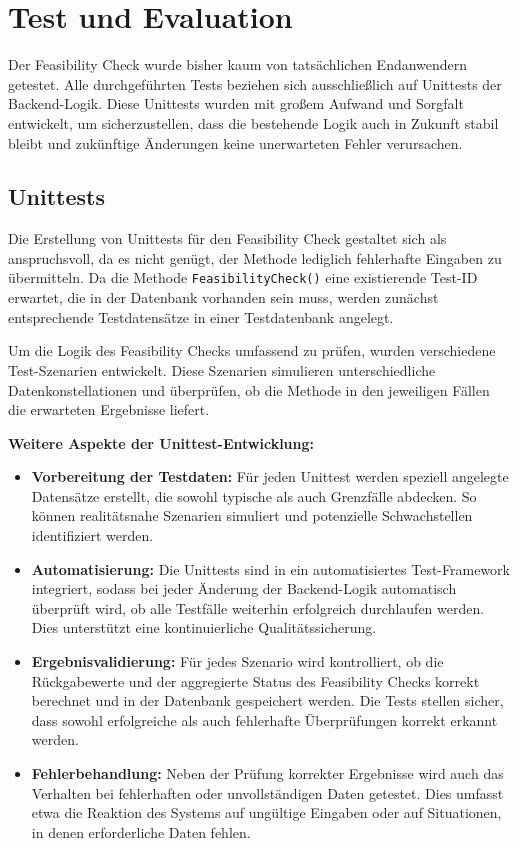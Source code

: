 \chapter{Test und Evaluation}

Der Feasibility Check wurde bisher kaum von tatsächlichen Endanwendern getestet. Alle durchgeführten Tests beziehen sich ausschließlich auf Unittests der Backend-Logik. Diese Unittests wurden mit großem Aufwand und Sorgfalt entwickelt, um sicherzustellen, dass die bestehende Logik auch in Zukunft stabil bleibt und zukünftige Änderungen keine unerwarteten Fehler verursachen.
\section{Unittests}

Die Erstellung von Unittests für den Feasibility Check gestaltet sich als anspruchsvoll, da es nicht genügt, der Methode lediglich fehlerhafte Eingaben zu übermitteln. Da die Methode \texttt{FeasibilityCheck()} eine existierende Test-ID erwartet, die in der Datenbank vorhanden sein muss, werden zunächst entsprechende Testdatensätze in einer Testdatenbank angelegt.

Um die Logik des Feasibility Checks umfassend zu prüfen, wurden verschiedene Test-Szenarien entwickelt. Diese Szenarien simulieren unterschiedliche Datenkonstellationen und überprüfen, ob die Methode in den jeweiligen Fällen die erwarteten Ergebnisse liefert.

\textbf{Weitere Aspekte der Unittest-Entwicklung:} \begin{itemize} \item \textbf{Vorbereitung der Testdaten:} Für jeden Unittest werden speziell angelegte Datensätze erstellt, die sowohl typische als auch Grenzfälle abdecken. So können realitätsnahe Szenarien simuliert und potenzielle Schwachstellen identifiziert werden. \item \textbf{Automatisierung:} Die Unittests sind in ein automatisiertes Test-Framework integriert, sodass bei jeder Änderung der Backend-Logik automatisch überprüft wird, ob alle Testfälle weiterhin erfolgreich durchlaufen werden. Dies unterstützt eine kontinuierliche Qualitätssicherung. \item \textbf{Ergebnisvalidierung:} Für jedes Szenario wird kontrolliert, ob die Rückgabewerte und der aggregierte Status des Feasibility Checks korrekt berechnet und in der Datenbank gespeichert werden. Die Tests stellen sicher, dass sowohl erfolgreiche als auch fehlerhafte Überprüfungen korrekt erkannt werden. \item \textbf{Fehlerbehandlung:} Neben der Prüfung korrekter Ergebnisse wird auch das Verhalten bei fehlerhaften oder unvollständigen Daten getestet. Dies umfasst etwa die Reaktion des Systems auf ungültige Eingaben oder auf Situationen, in denen erforderliche Daten fehlen. \end{itemize}

